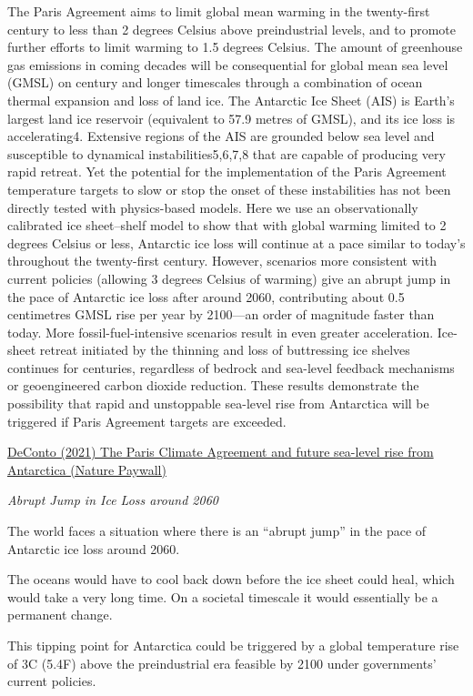 \documentclass[
]{book}
\begin{document}
The Paris Agreement aims to limit global mean warming in the twenty-first century to less than 2 degrees Celsius above preindustrial levels, and to promote further efforts to limit warming to 1.5 degrees Celsius. The amount of greenhouse gas emissions in coming decades will be consequential for global mean sea level (GMSL) on century and longer timescales through a combination of ocean thermal expansion and loss of land ice. The Antarctic Ice Sheet (AIS) is Earth's largest land ice reservoir (equivalent to 57.9 metres of GMSL), and its ice loss is accelerating4. Extensive regions of the AIS are grounded below sea level and susceptible to dynamical instabilities5,6,7,8 that are capable of producing very rapid retreat. Yet the potential for the implementation of the Paris Agreement temperature targets to slow or stop the onset of these instabilities has not been directly tested with physics-based models. Here we use an observationally calibrated ice sheet--shelf model to show that with global warming limited to 2 degrees Celsius or less, Antarctic ice loss will continue at a pace similar to today's throughout the twenty-first century. However, scenarios more consistent with current policies (allowing 3 degrees Celsius of warming) give an abrupt jump in the pace of Antarctic ice loss after around 2060, contributing about 0.5 centimetres GMSL rise per year by 2100---an order of magnitude faster than today. More fossil-fuel-intensive scenarios result in even greater acceleration. Ice-sheet retreat initiated by the thinning and loss of buttressing ice shelves continues for centuries, regardless of bedrock and sea-level feedback mechanisms or geoengineered carbon dioxide reduction. These results demonstrate the possibility that rapid and unstoppable sea-level rise from Antarctica will be triggered if Paris Agreement targets are exceeded.

\href{https://www.nature.com/articles/s41586-021-03427-0}{DeConto (2021) The Paris Climate Agreement and future sea-level rise from Antarctica (Nature Paywall)}

\emph{Abrupt Jump in Ice Loss around 2060}

The world faces a situation where there is an ``abrupt jump'' in the pace of Antarctic ice loss around 2060.

The oceans would have to cool back down before the ice sheet could heal, which would take a very long time. On a societal timescale it would essentially be a permanent change.

This tipping point for Antarctica could be triggered by a global temperature rise of 3C (5.4F) above the preindustrial era feasible by 2100 under governments' current policies.
\end{document}
